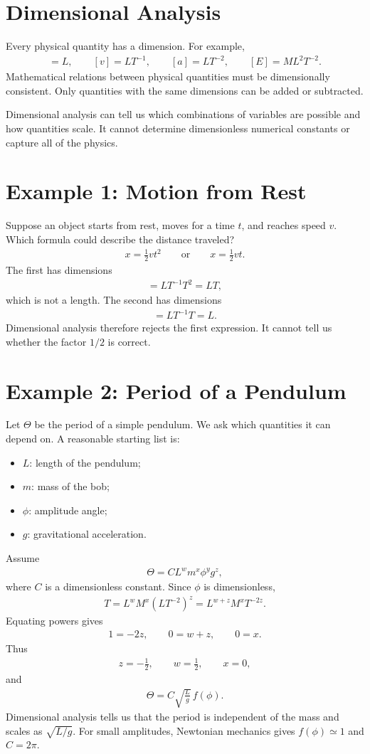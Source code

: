 \documentclass[12pt]{article}
\newcommand{\be}{\begin{eqnarray}}
\newcommand{\ee}{\end{eqnarray}}
\begin{document}
\section{Dimensional Analysis}
Every physical quantity has a dimension. For example,
\be
[x] = L,\qquad [v] = LT^{-1},\qquad [a] = LT^{-2},\qquad [E]=ML^2T^{-2}.
\ee
Mathematical relations between physical quantities must be dimensionally consistent. Only quantities with the same dimensions can be added or subtracted.

\begin{tcolorbox}[colback=blue!5!white]
Dimensional analysis can tell us which combinations of variables are possible and how quantities scale. It cannot determine dimensionless numerical constants or capture all of the physics.
\end{tcolorbox}

\section{Example 1: Motion from Rest}
Suppose an object starts from rest, moves for a time $t$, and reaches speed $v$. Which formula could describe the distance traveled?
\be
x = \frac{1}{2}v t^2
\qquad\text{or}\qquad
x = \frac{1}{2}v t.
\ee
The first has dimensions
\be
[v t^2] = LT^{-1}T^2 = LT,
\ee
which is not a length. The second has dimensions
\be
[v t] = LT^{-1}T = L.
\ee
Dimensional analysis therefore rejects the first expression. It cannot tell us whether the factor $1/2$ is correct.

\section{Example 2: Period of a Pendulum}
Let $\Theta$ be the period of a simple pendulum. We ask which quantities it can depend on. A reasonable starting list is:
\begin{itemize}
    \item $L$: length of the pendulum;
    \item $m$: mass of the bob;
    \item $\phi$: amplitude angle;
    \item $g$: gravitational acceleration.
\end{itemize}
Assume
\be
\Theta = C L^w m^x \phi^y g^z,
\ee
where $C$ is a dimensionless constant. Since $\phi$ is dimensionless,
\be
T = L^w M^x (LT^{-2})^z
  = L^{w+z} M^x T^{-2z}.
\ee
Equating powers gives
\be
1=-2z,\qquad 0=w+z,\qquad 0=x.
\ee
Thus
\be
z=-\frac{1}{2},\qquad w=\frac{1}{2},\qquad x=0,
\ee
and
\be
\Theta = C\sqrt{\frac{L}{g}}\,f(\phi).
\ee
Dimensional analysis tells us that the period is independent of the mass and scales as $\sqrt{L/g}$. For small amplitudes, Newtonian mechanics gives $f(\phi)\simeq 1$ and $C=2\pi$.
\end{document}
